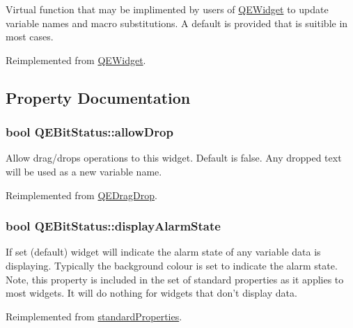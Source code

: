 \label{classQEBitStatus_acb5b1d97dca3db6081ad4f10717fe2e6}
Virtual function that may be implimented by users of \hyperlink{classQEWidget}{QEWidget} to update variable names and macro substitutions. A default is provided that is suitible in most cases. 

Reimplemented from \hyperlink{classQEWidget_aad46c00865cd37a2221ea69fbaee8806}{QEWidget}.



\subsection{Property Documentation}
\hypertarget{classQEBitStatus_aa507f49e6c2ed6d62f83eadc9451b75c}{
\subsubsection[{allowDrop}]{\setlength{\rightskip}{0pt plus 5cm}bool QEBitStatus::allowDrop}}
\label{classQEBitStatus_aa507f49e6c2ed6d62f83eadc9451b75c}
Allow drag/drops operations to this widget. Default is false. Any dropped text will be used as a new variable name. 

Reimplemented from \hyperlink{classQEDragDrop}{QEDragDrop}.

\hypertarget{classQEBitStatus_a5a84d6ec6d0e3855f2cd7936a3678341}{
\subsubsection[{displayAlarmState}]{\setlength{\rightskip}{0pt plus 5cm}bool QEBitStatus::displayAlarmState}}
\label{classQEBitStatus_a5a84d6ec6d0e3855f2cd7936a3678341}
If set (default) widget will indicate the alarm state of any variable data is displaying. Typically the background colour is set to indicate the alarm state. Note, this property is included in the set of standard properties as it applies to most widgets. It will do nothing for widgets that don't display data. 

Reimplemented from \hyperlink{classstandardProperties}{standardProperties}.


